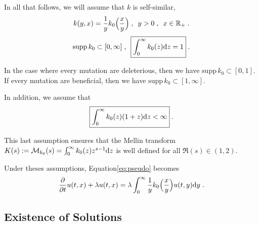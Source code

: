 \documentclass[11pt]{amsart}
\newcommand{\supp}{\mathrm{supp}\,}
\begin{document}
In all that follows, we will assume that $k$ is self-similar, \ie 
    \begin{equation*}
        k(y, x) = \frac{1}{y} k_0 \Big(\frac{x}{y} \Big)
        \; , \enspace
        y > 0
        \; , \enspace 
        x \in \mathbb{R}_+
        \; .
    \end{equation*}
    \begin{equation*}
        \supp k_0 \subset [0, \infty] 
        \eqsepv
        \boxed{\int_0^\infty k_0(z) \dz = 1}
        \eqfinp
    \end{equation*}
    
\begin{remark}
    In the case where every mutation are deleterious, then we have $\supp k_0 \subset [0, 1] $. If every mutation are beneficial, then we have $\supp k_0 \subset [1, \infty]$.
\end{remark}
    
In addition, we assume that 
    \begin{equation}
        \boxed{\int_0^\infty k_0(z) (1 + z) \mathrm dz < \infty}
        \; .
        \label{H:douesco4}
    \end{equation}
    
\begin{remark}
    This last assumption ensures that the Mellin transform $K(s) := \mathcal{M}_{k_0}(s) = \int_0^\infty k_0(z)z^{s-1}\mathrm dz$ is well defined for all $\Re(s) \in (1, 2)$.
\end{remark}
    
Under theses assumptions, Equation\eqref{eq:pseudo} becomes
    \begin{equation}
    	\frac{\partial}{\partial t}u(t,x) + \lambda u(t,x) = \lambda \int_{0}^{\infty} \frac{1}{y} k_0 \Big(\frac{x}{y} \Big) u(t,y) \mathrm dy
	    \; . 
	    \label{eq:similar_pseudo_growth_equation}
    \end{equation}
    


\subsection{Existence of Solutions}
\end{document}
